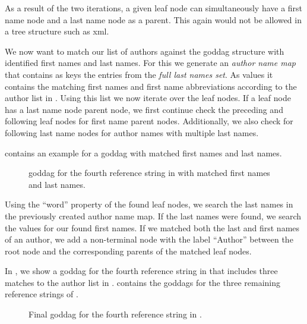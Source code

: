 As a result of the two iterations, a given leaf node can simultaneously have a first name node and a last name node as a parent.
This again would not be allowed in a tree structure such as \gls{xml}.

We now want to match our list of authors against the \gls{goddag} structure with identified first names and last names.
For this we generate an \textit{author name map} that contains as keys the entries from the \textit{full last names set}.
As values it contains the matching first names and first name abbreviations according to the author list in .
Using this list we now iterate over the leaf nodes.
If a leaf node has a last name node parent node, we first continue check the preceding and following leaf nodes for first name parent nodes.
Additionally, we also check for following last name nodes for author names with multiple last names.

 contains an example for a \gls{goddag} with matched first names and last names.
\begin{figure}[t]
  \centering
\resizebox{\linewidth}{!}{%
  
}
\caption{\gls{goddag} for the fourth reference string in  with matched first names and last names.}
\label{fig:example-goddag-4-names}
\end{figure}

Using the ``word'' property of the found leaf nodes, we search the last names in the previously created author name map.
If the last names were found, we search the values for our found first names.
If we matched both the last and first names of an author, we add a non-terminal node with the label ``Author'' between the root node and the corresponding parents of the matched leaf nodes.

In , we show a \gls{goddag} for the fourth reference string in  that includes three matches to the author list in .
 contains the \glspl{goddag} for the three remaining reference strings of .
\begin{figure}[t]
  \centering
\resizebox{\linewidth}{!}{%
  
}
\caption{Final \gls{goddag} for the fourth reference string in .}
\label{fig:example-goddag-4-final}
\end{figure}

